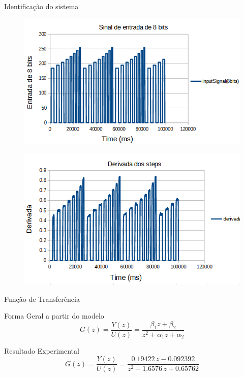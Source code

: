\documentclass{beamer}
\begin{document}
\begin{frame}{Identificação do sistema}
\begin{figure}
    \centering
    \includegraphics[width = 0.6\linewidth]{sinal_8_bits.PNG}
    \label{fig:control_1}
\end{figure}
\begin{figure}
    \centering
    \includegraphics[width = 0.6\linewidth]{derivada_steps.PNG}
    \label{fig:control_1}
\end{figure}
\end{frame}

\begin{frame}{Função de Transferência}
    \begin{block}{Forma Geral a partir do modelo}
        \begin{equation}\label{eq:gz_general}
            G(z) = \frac{Y(z)}{U(z)} = \frac{\beta_1 z + \beta_2}{z^2 + \alpha_1 z + \alpha_2}
        \end{equation}
    \end{block}
    
    \begin{block}{Resultado Experimental}
        \begin{equation}
        G(z) = \frac{Y(z)}{U(z)} = \frac{0.19422\,z-0.092392}{z^2-1.6576\,z+0.65762}
        \label{transfdisc}
        \end{equation}
    \end{block}
\end{frame}
\end{document}
